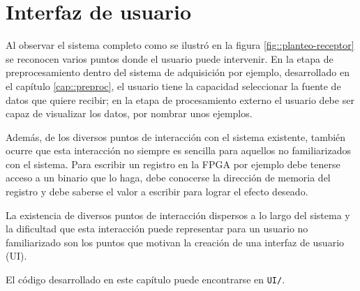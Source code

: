 \documentclass[../../main.tex]{subfiles}
\begin{document}
\graphicspath{{./figures}}
\chapter{Interfaz de usuario}
Al observar el sistema completo como se ilustró en la figura \ref{fig::planteo-receptor} se reconocen varios puntos donde el usuario puede intervenir. En la etapa de preprocesamiento dentro del sistema de adquisición por ejemplo, desarrollado en el capítulo \ref{cap::preproc}, el usuario tiene la capacidad seleccionar la fuente de datos que quiere recibir; en la etapa de procesamiento externo el usuario debe ser capaz de visualizar los datos, por nombrar unos ejemplos.

Además, de los diversos puntos de interacción con el sistema existente, también ocurre que esta interacción no siempre es sencilla para aquellos no familiarizados con el sistema. Para escribir un registro en la FPGA por ejemplo debe tenerse acceso a un binario que lo haga, debe conocerse la dirección de memoria del registro y debe saberse el valor a escribir para lograr el efecto deseado.

La existencia de diversos puntos de interacción dispersos a lo largo del sistema y la dificultad que esta interacción puede representar para un usuario no familiarizado son los puntos que motivan la creación de una interfaz de usuario (UI).

El código desarrollado en este capítulo puede encontrarse en \texttt{UI/}.
\end{document}
